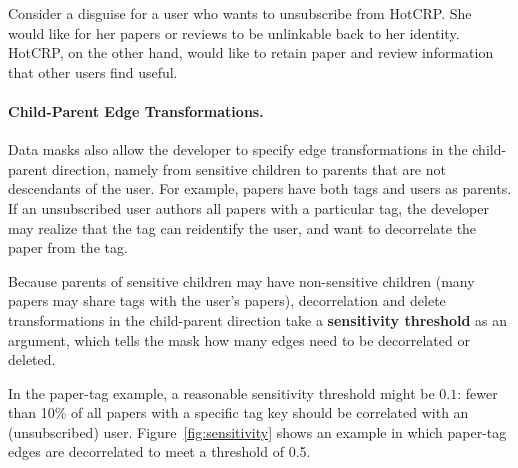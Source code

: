 Consider a disguise for a user who wants to unsubscribe from HotCRP. She would like for her papers
or reviews to be unlinkable back to her identity. HotCRP, on the other hand, would like to retain
paper and review information that other users find useful.



\iffalse


\paragraph{Child-Parent Edge Transformations.}
Data masks also allow the developer to specify edge transformations in the child-parent direction,
namely from sensitive children to parents that are not descendants of the user.
%
For example, papers have both tags and users as parents. If an unsubscribed user authors all papers
with a particular tag, the developer may realize that the tag can reidentify the user, and want to
decorrelate the paper from the tag.

Because parents of sensitive children may have non-sensitive children (\eg many papers may share
tags with the user's papers), decorrelation and delete transformations in the child-parent direction
take a \textbf{sensitivity threshold} as an argument, which tells the mask how many edges need to be
decorrelated or deleted.

In the paper-tag example, a reasonable sensitivity threshold
might be $0.1$: fewer than 10\% of all papers with a specific tag key should be correlated with an
(unsubscribed) user.  Figure~\ref{fig:sensitivity} shows an example in which paper-tag edges are
decorrelated to meet a threshold of 0.5.

